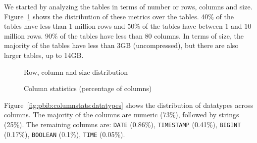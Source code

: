 We started by analyzing the tables in terms of number or rows, columns and size. Figure~\ref{fig:pbib:generalstats} shows the distribution of these metrics over the tables. 40\% of the tables have less than 1 million rows and 50\% of the tables have between 1 and 10 million rows. 90\% of the tables have less than 80 columns. In terms of size, the majority of the tables have less than 3GB (uncompressed), but there are also larger tables, up to 14GB.

\begin{figure}[h]
\centering
{}
\caption{Row, column and size distribution}
\label{fig:pbib:generalstats}
\end{figure}

\begin{figure}[h]
\centering
{}
\caption{Column statistics (percentage of columns)}
\label{fig:pbib:columnstats}
\end{figure}

Figure~\ref{fig:pbib:columnstats:datatypes} shows the distribution of datatypes across columns. The majority of the columns are numeric (73\%), followed by strings (25\%). The remaining columns are: \verb|DATE| (0.86\%), \verb|TIMESTAMP| (0.41\%), \verb|BIGINT| (0.17\%), \verb|BOOLEAN| (0.1\%), \verb|TIME| (0.05\%).

